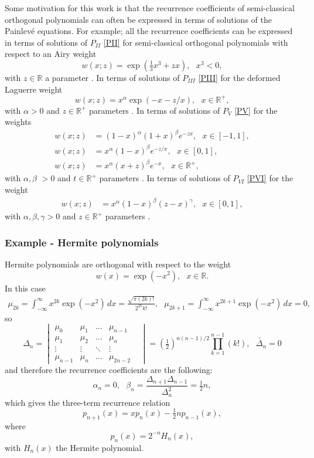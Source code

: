 \documentclass[12pt]{article}
\def\P{Painlev\'e }
\def\R{\mathbb{R}}
\numberwithin{figure}{section}
\numberwithin{equation}{section}
\numberwithin{table}{section}
\begin{document}
Some motivation for this work is that the recurrence coefficients of semi-classical orthogonal polynomials can often be expressed in terms of solutions of the \P equations. For example; all the recurrence coefficients can be expressed in terms of solutions of $P_{II}$ \eqref{PII} for semi-classical orthogonal polynomials with respect to an Airy weight
\begin{equation}\label{P2weight}
w(x;z)=\exp(\tfrac{1}{3}x^3+zx),~~~x^3<0,
\end{equation}
with $z\in\R$ a parameter \cite{P:57:37}.
In terms of solutions of $P_{III}$ \eqref{PIII} for the deformed Laguerre weight
\begin{equation}\nonumber
w(x;z)=x^\alpha\exp(-x-z/x),~~~x\in\R^{+},
\end{equation}
with $\alpha>0$ and $z\in\R^{+}$ parameters \cite{P:162:97}.
In terms of solutions of $P_{V}$ \eqref{PV} for the weights
\begin{align}\nonumber
w(x;z)&=(1-x)^\alpha(1+x)^\beta e^{-zx},~~~x\in[-1,1],\\\nonumber
w(x;z)&=x^\alpha(1-x)^\beta e^{-z/x},~~~x\in[0,1],\\\nonumber
w(x;z)&=x^\alpha(x+z)^\beta e^{-x},~~~x\in\R^{+},
\end{align}
with $\alpha, \beta$ $>0$ and $t\in\R^{+}$ parameters \cite{Basor,P:1303.0773,Chen,P:58:4634,P:61:526}.
In terms of solutions of $P_{VI}$ \eqref{PVI} for the weight
\begin{align}\nonumber
w(x;z)&=x^\alpha(1-x)^\beta(z-x)^\gamma,~~~x\in[0,1],
\end{align}
with $\alpha,\beta,\gamma>0$ and $z\in\R^+$ parameters \cite{P:860:463,P:58:4634,P:43:055207,P:57:37}.
\subsubsection{Example - Hermite polynomials}
Hermite polynomials are orthogonal with respect to the weight
$$w(x)=\exp(-x^2),~~~x\in\R.$$
In this case
\begin{align}
\mu_{2k}=\int^\infty_{-\infty}x^{2k}\exp(-x^2)\,dx=\frac{\sqrt{\pi(2k)!}}{2^{2k}k!},~~~
\mu_{2k+1}=\int^\infty_{-\infty}x^{2k+1}\exp(-x^2)\,dx=0,
\end{align}
so
$$
\Delta_n=\begin{vmatrix}
\mu_{0} & \mu_1  &\hdots& \mu_{n-1} \\
\mu_1 & \mu_2  &\hdots& \mu_n  \\
\vdots  &\vdots & \ddots &\vdots & \\
\mu_{n-1} & \mu_n  &\hdots& \mu_{2n-2}
\end{vmatrix}=(\tfrac{1}{2})^{n(n-1)/2}\prod^{n-1}_{k=1}(k!),~~~\widetilde{\Delta_n}=0
$$
and therefore the recurrence coefficients are the following:
$$\alpha_n=0,~~~\beta_n=\frac{\Delta_{n+1}\Delta_{n-1}}{\Delta_n^2}=\tfrac{1}{2}n,$$
which gives the three-term recurrence relation
$$p_{n+1}(x)=xp_n(x)-\tfrac{1}{2}np_{n-1}(x),$$
where
$$p_n(x)=2^{-n}H_n(x),$$
with $H_n(x)$ the Hermite polynomial.
\end{document}
